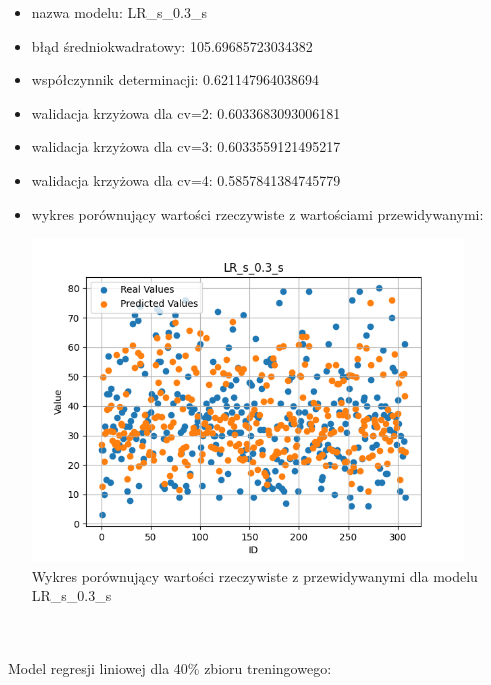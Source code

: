 \documentclass[11pt, a4paper, notitlepage]{report}
\begin{document}
\begin{itemize}
	\item nazwa modelu: LR\_s\_0.3\_s
	\item błąd średniokwadratowy: 105.69685723034382
	\item współczynnik determinacji: 0.621147964038694
	\item walidacja krzyżowa dla cv=2: 0.6033683093006181
	\item walidacja krzyżowa dla cv=3: 0.6033559121495217
	\item walidacja krzyżowa dla cv=4: 0.5857841384745779
	\item wykres porównujący wartości rzeczywiste z wartościami przewidywanymi: \begin{center} \small
		\includegraphics[width=0.9\textwidth]{graphics/plots/LR_s_0.3_s.png} \\
		\caption{Wykres porównujący wartości rzeczywiste z przewidywanymi dla modelu LR\_s\_0.3\_s}
	\end{center}
	\end{itemize}
\\ \\
Model regresji liniowej dla 40\% zbioru treningowego:
\end{document}
